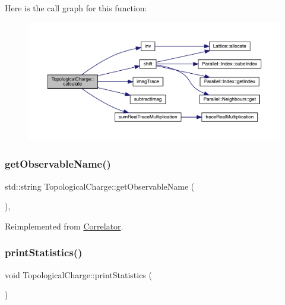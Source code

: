 Here is the call graph for this function\+:\nopagebreak
\begin{figure}[H]
\begin{center}
\leavevmode
\includegraphics[width=350pt]{class_topological_charge_a8ed78c28c3484df04b1cb24187de2f5b_cgraph}
\end{center}
\end{figure}
\mbox{\label{class_topological_charge_ad12d246692f3d9ea0ef591814010ef88}} 
\subsubsection{\texorpdfstring{getObservableName()}{getObservableName()}}
{\footnotesize\ttfamily std\+::string Topological\+Charge\+::get\+Observable\+Name (\begin{DoxyParamCaption}{ }\end{DoxyParamCaption})\hspace{0.3cm}{\ttfamily [inline]}, {\ttfamily [virtual]}}



Reimplemented from \mbox{\hyperlink{class_correlator_ad1fa59e864917c3e48da037f90c3488f}{Correlator}}.

\mbox{\label{class_topological_charge_ad56263921d283d315b04ab40c9594a2c}} 
\subsubsection{\texorpdfstring{printStatistics()}{printStatistics()}}
{\footnotesize\ttfamily void Topological\+Charge\+::print\+Statistics (\begin{DoxyParamCaption}{ }\end{DoxyParamCaption})\hspace{0.3cm}{\ttfamily [virtual]}}




